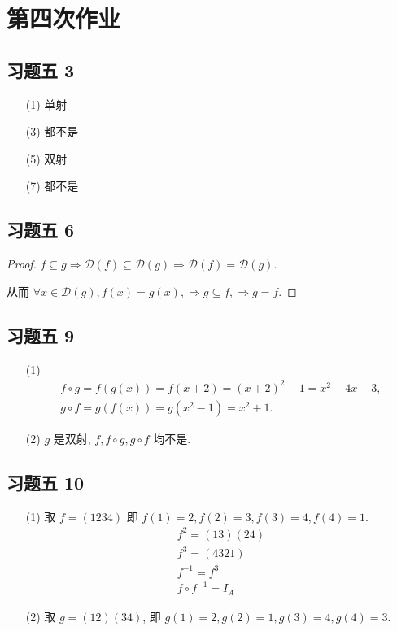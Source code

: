 \chapter{第四次作业}

\section{习题五 3}

\begin{itemize}[leftmargin=1.5cm]
	\item[(1)] 单射
	\item[(3)] 都不是
	\item[(5)] 双射
	\item[(7)] 都不是
\end{itemize}


\section{习题五 6}

\begin{proof}
	$f\subseteq g\Rightarrow \mathscr{D}(f)\subseteq\mathscr{D}(g)\Rightarrow\mathscr{D}(f)=\mathscr{D}(g)$.
	
	从而 $\forall x\in \mathscr{D}(g),f(x)=g(x),\Rightarrow g\subseteq f,\Rightarrow g=f.$
\end{proof}

\section{习题五 9}

\begin{solution}
	\begin{itemize}
		\item[(1)]
		$$
		\begin{array}{l}
			f\circ g=f(g(x))=f(x+2)=(x+2)^2-1=x^2+4x+3,\\
			g\circ f=g(f(x))=g(x^2-1)=x^2+1.
		\end{array}$$
		\item[(2)] $g$ 是双射, $f,f\circ g,g\circ f$ 均不是.
	\end{itemize}
\end{solution}

\section{习题五 10}

\begin{solution}
	\begin{itemize}
		\item[(1)] 取 $f=(1234)$ 即 $f(1)=2,f(2)=3,f(3)=4,f(4)=1$.
		$$
		\begin{array}{c}
			f^2=(13)(24) \\
			f^3=(4321) \\
			f^{-1}=f^3 \\
			f\circ f^{-1}=I_A
		\end{array}
		$$
		\item[(2)] 取 $g=(12)(34)$, 即 $g(1)=2,g(2)=1,g(3)=4,g(4)=3$.
	\end{itemize}
\end{solution}

